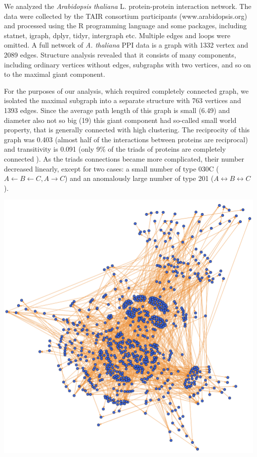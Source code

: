 \documentclass[a0,portrait]{a0poster}
\begin{document}
\begin{multicols}{2}
We analyzed the \textit{Arabidopsis thaliana} L. protein-protein interaction network. The data were collected by the TAIR consortium participants (www.arabidopsis.org) and processed using the R programming language and some packages, including statnet, igraph, dplyr, tidyr, intergraph etc. Multiple edges and loops were omitted. A full network of \textit{A. thaliana} PPI data is a graph with 1332 vertex and 2089 edges. Structure analysis revealed that it consists of many components, including ordinary vertices without edges, subgraphs with two vertices, and so on to the maximal giant component. 

For the purposes of our analysis, which required completely connected graph, we isolated the maximal subgraph into a separate structure with 763 vertices and 1393 edges. Since the average path length of this graph is small (6.49) and diameter also not so big (19) this giant component had so-called small world property, that is generally connected with high clustering. The reciprocity of this graph was 0.403 (almost half of the interactions between proteins are reciprocal) and transitivity is 0.091 (only 9\% of the triads of proteins are completely connected ). As the triads connections became more complicated, their number decreased linearly, except for two cases: a small number of type 030C ($A \leftarrow B\leftarrow C, A\rightarrow C$) and an anomalously large number of type 201 ($A\leftrightarrow B\leftrightarrow C$). 


\begin{center}\vspace{.2cm}
\includegraphics[width=0.8\linewidth]{GiantComp.pdf}
\end{center}\vspace{.2cm}


\end{multicols}
\end{document}
